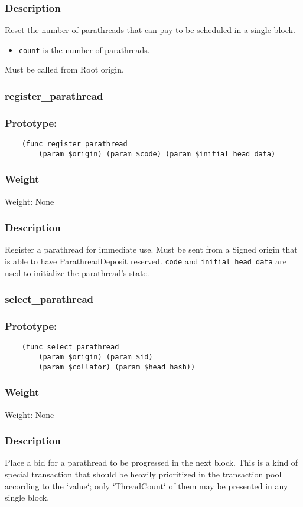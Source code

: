 \documentclass[11pt,a4paper]{article}
\begin{document}
\subsubsection*{Description}
Reset the number of parathreads that can pay to be scheduled in a single block.
\begin{itemize}
\item \verb|count| is the number of parathreads.
\end{itemize}
Must be called from Root origin.

\subsubsection{register\_parathread}
\subsubsection*{Prototype:}
\begin{verbatim}
    (func register_parathread
        (param $origin) (param $code) (param $initial_head_data)
\end{verbatim}
\subsubsection*{Weight}
Weight: None
\subsubsection*{Description}
Register a parathread for immediate use. Must be sent from a Signed origin that is able to have ParathreadDeposit reserved. \verb|code| and \verb|initial_head_data| are used to initialize the parathread's state.

\subsubsection{select\_parathread}
\subsubsection*{Prototype:}
\begin{verbatim}
    (func select_parathread
        (param $origin) (param $id)
        (param $collator) (param $head_hash))
\end{verbatim}
\subsubsection*{Weight}
Weight: None
\subsubsection*{Description}
Place a bid for a parathread to be progressed in the next block. This is a kind of special transaction that should be heavily prioritized in the transaction pool according to the `value`; only `ThreadCount` of them may be presented in any single block.
\end{document}
